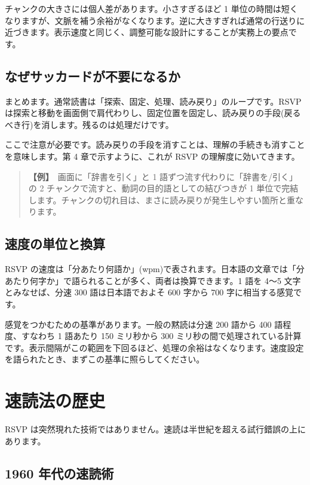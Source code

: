 \documentclass{article}
\begin{document}
チャンクの大きさには個人差があります。小さすぎるほど 1 単位の時間は短くなりますが、文脈を補う余裕がなくなります。逆に大きすぎれば通常の行送りに近づきます。表示速度と同じく、調整可能な設計にすることが実務上の要点です。

\subsection{なぜサッカードが不要になるか}

まとめます。通常読書は「探索、固定、処理、読み戻り」のループです。RSVP は探索と移動を画面側で肩代わりし、固定位置を固定し、読み戻りの手段(戻るべき行)を消します。残るのは処理だけです。

ここで注意が必要です。読み戻りの手段を消すことは、理解の手続きも消すことを意味します。第 4 章で示すように、これが RSVP の理解度に効いてきます。

\begin{quote}
\textbf{【例】}\ 画面に「辞書を引く」と 1 語ずつ流す代わりに「辞書を/引く」の 2 チャンクで流すと、動詞の目的語としての結びつきが 1 単位で完結します。チャンクの切れ目は、まさに読み戻りが発生しやすい箇所と重なります。
\end{quote}

\subsection{速度の単位と換算}

RSVP の速度は「分あたり何語か」(wpm)で表されます。日本語の文章では「分あたり何字か」で語られることが多く、両者は換算できます。1 語を 4〜5 文字とみなせば、分速 300 語は日本語でおよそ 600 字から 700 字に相当する感覚です。

感覚をつかむための基準があります。一般の黙読は分速 200 語から 400 語程度、すなわち 1 語あたり 150 ミリ秒から 300 ミリ秒の間で処理されている計算です。表示間隔がこの範囲を下回るほど、処理の余裕はなくなります。速度設定を語られたとき、まずこの基準に照らしてください。

\section{速読法の歴史}

RSVP は突然現れた技術ではありません。速読は半世紀を超える試行錯誤の上にあります。

\subsection{1960 年代の速読術}
\end{document}

